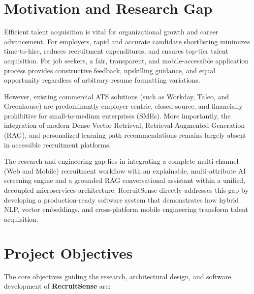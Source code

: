 \section{Motivation and Research Gap}
Efficient talent acquisition is vital for organizational growth and career advancement. For employers, rapid and accurate candidate shortlisting minimizes time-to-hire, reduces recruitment expenditures, and ensures top-tier talent acquisition. For job seekers, a fair, transparent, and mobile-accessible application process provides constructive feedback, upskilling guidance, and equal opportunity regardless of arbitrary resume formatting variations.

However, existing commercial ATS solutions (such as Workday, Taleo, and Greenhouse) are predominantly employer-centric, closed-source, and financially prohibitive for small-to-medium enterprises (SMEs). More importantly, the integration of modern Dense Vector Retrieval, Retrieval-Augmented Generation (RAG), and personalized learning path recommendations remains largely absent in accessible recruitment platforms.

The research and engineering gap lies in integrating a complete multi-channel (Web and Mobile) recruitment workflow with an explainable, multi-attribute AI screening engine and a grounded RAG conversational assistant within a unified, decoupled microservices architecture. RecruitSense directly addresses this gap by developing a production-ready software system that demonstrates how hybrid NLP, vector embeddings, and cross-platform mobile engineering transform talent acquisition.

\section{Project Objectives}
The core objectives guiding the research, architectural design, and software development of \textbf{RecruitSense} are:

